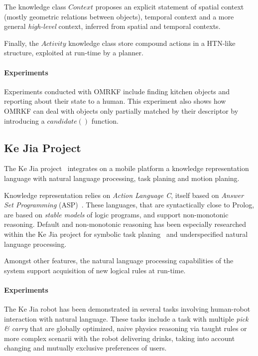 The knowledge class $Context$ proposes an explicit statement of spatial context
(mostly geometric relations between objects), temporal context and a more
general \emph{high-level} context, inferred from spatial and temporal contexts.

Finally, the $Activity$ knowledge class store compound actions in a HTN-like
structure, exploited at run-time by a planner.

\paragraph{Experiments} Experiments conducted with OMRKF include finding
kitchen objects and reporting about their state to a human.  This experiment
also shows how OMRKF can deal with objects only partially matched by their
descriptor by introducing a $candidate()$ function.

\subsection{Ke Jia Project}
\label{sect|kejia}

The Ke Jia project~\cite{Chen2010} integrates on a mobile platform a knowledge
representation language with natural language processing, task planing and
motion planing.

Knowledge representation relies on \emph{Action Language C}, itself based on
\emph{Answer Set Programming} (ASP)~\cite{Gelfond2008}. These languages, that
are syntactically close to Prolog, are based on \emph{stable models} of logic
programs, and support non-monotonic reasoning. Default and non-monotonic
reasoning has been especially researched within the Ke Jia project for symbolic
task planing~\cite{Ji2011} and underspecified natural language processing.

Amongst other features, the natural language processing capabilities of the
system support acquisition of new logical rules at run-time.

\paragraph{Experiments} The Ke Jia robot has been demonstrated in several tasks
involving human-robot interaction with natural language. These tasks include a
task with multiple \emph{pick \& carry} that are globally optimized, naive
physics reasoning via taught rules or more complex scenarii with the robot
delivering drinks, taking into account changing and mutually exclusive
preferences of users.

